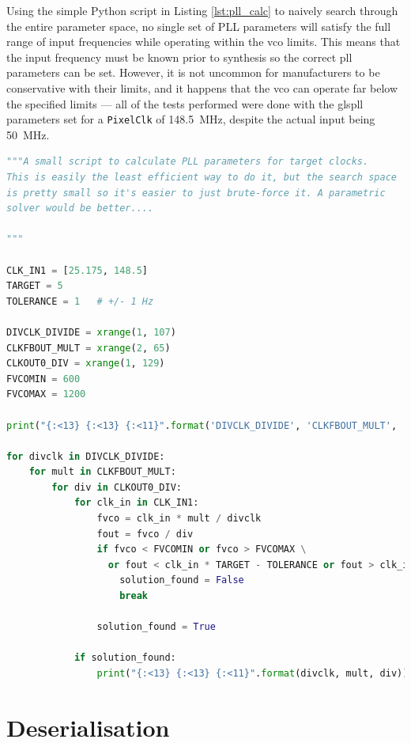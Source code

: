 Using the simple Python script in Listing \ref{lst:pll_calc} to naively search through the entire parameter space, no single set of PLL parameters will satisfy the full range of input frequencies while operating within the \gls{vco} limits. This means that the input frequency must be known prior to synthesis so the correct \gls{pll} parameters can be set. However, it is not uncommon for manufacturers to be conservative with their limits, and it happens that the \gls{vco} can operate far below the specified limits --- all of the tests performed were done with the gls{pll} parameters set for a \texttt{PixelClk} of \SI{148.5}{\mega\hertz}, despite the actual input being \SI{50}{\mega\hertz}. 

\begin{lstlisting}[caption={PLL parameter calculator script.}, label={lst:pll_calc}, language=Python]
"""A small script to calculate PLL parameters for target clocks.
This is easily the least efficient way to do it, but the search space
is pretty small so it's easier to just brute-force it. A parametric
solver would be better....

"""

CLK_IN1 = [25.175, 148.5]
TARGET = 5
TOLERANCE = 1   # +/- 1 Hz

DIVCLK_DIVIDE = xrange(1, 107)
CLKFBOUT_MULT = xrange(2, 65)
CLKOUT0_DIV = xrange(1, 129)
FVCOMIN = 600
FVCOMAX = 1200

print("{:<13} {:<13} {:<11}".format('DIVCLK_DIVIDE', 'CLKFBOUT_MULT', 'CLKOUT0_DIV'))

for divclk in DIVCLK_DIVIDE:
    for mult in CLKFBOUT_MULT:
        for div in CLKOUT0_DIV:
            for clk_in in CLK_IN1:
                fvco = clk_in * mult / divclk
                fout = fvco / div
                if fvco < FVCOMIN or fvco > FVCOMAX \
                  or fout < clk_in * TARGET - TOLERANCE or fout > clk_in * TARGET + TOLERANCE:
                    solution_found = False
                    break

                solution_found = True
            
            if solution_found: 
                print("{:<13} {:<13} {:<11}".format(divclk, mult, div))
\end{lstlisting}

\section{Deserialisation}

